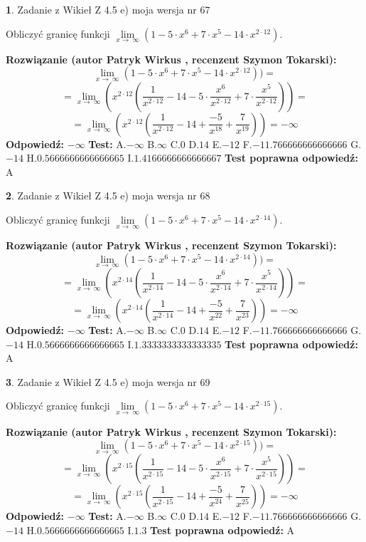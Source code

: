 \documentclass[12pt, a4paper]{article}
\theoremstyle{definition} %
\newtheorem{zad}{}
\newcommand{\zadStart}[1]{\begin{zad}#1\newline}
\newcommand{\zadStop}{\end{zad}}
\newcommand{\rozwStart}[2]{\noindent \textbf{Rozwiązanie (autor #1 , recenzent #2): }\newline}
\newcommand{\rozwStop}{\newline}
\newcommand{\odpStart}{\noindent \textbf{Odpowiedź:}\newline}
\newcommand{\odpStop}{\newline}
\newcommand{\testStart}{\noindent \textbf{Test:}\newline}
\newcommand{\testStop}{\newline}
\newcommand{\kluczStart}{\noindent \textbf{Test poprawna odpowiedź:}\newline}
\newcommand{\kluczStop}{\newline}
\begin{document}
\zadStart{Zadanie z Wikieł Z 4.5 e) moja wersja nr 67}


Obliczyć granicę funkcji  $\lim\limits_{x\to\ \infty}(1 - 5 \cdot x^{6}+7 \cdot x^{5}- 14 \cdot x^{2\cdot12})$.
\zadStop
\rozwStart{Patryk Wirkus}{Szymon Tokarski}
$$\lim\limits_{x\to\ \infty}(1 - 5 \cdot x^{6}+7 \cdot x^{5}- 14 \cdot x^{2\cdot12}))=$$
$$=\lim\limits_{x\to\ \infty}(x^{2\cdot12}(\frac{1}{x^{2\cdot12}}-14 -5 \cdot \frac{x^{6}}{x^{2\cdot12}}+7 \cdot \frac{x^{5}}{x^{2\cdot12}}))=$$
$$=\lim\limits_{x\to\ \infty}(x^{2\cdot12}(\frac{1}{x^{2\cdot12}}-14 + \frac{-5}{x^{18}}+ \frac{7}{x^{19}}))=-\infty$$
\rozwStop
\odpStart
$-\infty$
\odpStop
\testStart
A.$-\infty$ B.$\infty$ C.$0$ D.$14$ E.$-12$
F.$-11.766666666666666$ G.$-14$
H.$0.5666666666666665$
I.$1.4166666666666667$
\testStop
\kluczStart
A
\kluczStop



\zadStart{Zadanie z Wikieł Z 4.5 e) moja wersja nr 68}


Obliczyć granicę funkcji  $\lim\limits_{x\to\ \infty}(1 - 5 \cdot x^{6}+7 \cdot x^{5}- 14 \cdot x^{2\cdot14})$.
\zadStop
\rozwStart{Patryk Wirkus}{Szymon Tokarski}
$$\lim\limits_{x\to\ \infty}(1 - 5 \cdot x^{6}+7 \cdot x^{5}- 14 \cdot x^{2\cdot14}))=$$
$$=\lim\limits_{x\to\ \infty}(x^{2\cdot14}(\frac{1}{x^{2\cdot14}}-14 -5 \cdot \frac{x^{6}}{x^{2\cdot14}}+7 \cdot \frac{x^{5}}{x^{2\cdot14}}))=$$
$$=\lim\limits_{x\to\ \infty}(x^{2\cdot14}(\frac{1}{x^{2\cdot14}}-14 + \frac{-5}{x^{22}}+ \frac{7}{x^{23}}))=-\infty$$
\rozwStop
\odpStart
$-\infty$
\odpStop
\testStart
A.$-\infty$ B.$\infty$ C.$0$ D.$14$ E.$-12$
F.$-11.766666666666666$ G.$-14$
H.$0.5666666666666665$
I.$1.3333333333333335$
\testStop
\kluczStart
A
\kluczStop



\zadStart{Zadanie z Wikieł Z 4.5 e) moja wersja nr 69}


Obliczyć granicę funkcji  $\lim\limits_{x\to\ \infty}(1 - 5 \cdot x^{6}+7 \cdot x^{5}- 14 \cdot x^{2\cdot15})$.
\zadStop
\rozwStart{Patryk Wirkus}{Szymon Tokarski}
$$\lim\limits_{x\to\ \infty}(1 - 5 \cdot x^{6}+7 \cdot x^{5}- 14 \cdot x^{2\cdot15}))=$$
$$=\lim\limits_{x\to\ \infty}(x^{2\cdot15}(\frac{1}{x^{2\cdot15}}-14 -5 \cdot \frac{x^{6}}{x^{2\cdot15}}+7 \cdot \frac{x^{5}}{x^{2\cdot15}}))=$$
$$=\lim\limits_{x\to\ \infty}(x^{2\cdot15}(\frac{1}{x^{2\cdot15}}-14 + \frac{-5}{x^{24}}+ \frac{7}{x^{25}}))=-\infty$$
\rozwStop
\odpStart
$-\infty$
\odpStop
\testStart
A.$-\infty$ B.$\infty$ C.$0$ D.$14$ E.$-12$
F.$-11.766666666666666$ G.$-14$
H.$0.5666666666666665$
I.$1.3$
\testStop
\kluczStart
A
\kluczStop
\end{document}
